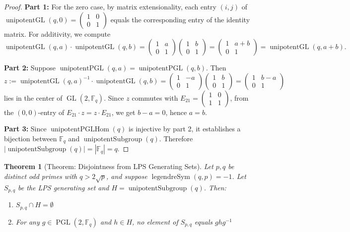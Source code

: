 \documentclass[11pt]{article}
\theoremstyle{plain}
\newtheorem*{theorem}{Theorem}
\theoremstyle{definition}
\theoremstyle{remark}
\begin{document}
\begin{proof}
\textbf{Part 1:} For the zero case, by matrix extensionality, each entry $(i,j)$ of $\operatorname{unipotentGL}(q,0) = \begin{pmatrix}1&0\\0&1\end{pmatrix}$ equals the corresponding entry of the identity matrix. For additivity, we compute
\[
\operatorname{unipotentGL}(q,a) \cdot \operatorname{unipotentGL}(q,b) = \begin{pmatrix}1&a\\0&1\end{pmatrix}\begin{pmatrix}1&b\\0&1\end{pmatrix} = \begin{pmatrix}1&a+b\\0&1\end{pmatrix} = \operatorname{unipotentGL}(q,a+b).
\]

\textbf{Part 2:} Suppose $\operatorname{unipotentPGL}(q,a) = \operatorname{unipotentPGL}(q,b)$. Then
\[
z := \operatorname{unipotentGL}(q,a)^{-1} \cdot \operatorname{unipotentGL}(q,b) = \begin{pmatrix}1&-a\\0&1\end{pmatrix}\begin{pmatrix}1&b\\0&1\end{pmatrix} = \begin{pmatrix}1&b-a\\0&1\end{pmatrix}
\]
lies in the center of $\operatorname{GL}(2, \mathbb{F}_q)$. Since $z$ commutes with $E_{21} = \begin{pmatrix}1&0\\1&1\end{pmatrix}$, from the $(0,0)$-entry of $E_{21} \cdot z = z \cdot E_{21}$, we get $b - a = 0$, hence $a = b$.

\textbf{Part 3:} Since $\operatorname{unipotentPGLHom}(q)$ is injective by part 2, it establishes a bijection between $\mathbb{F}_q$ and $\operatorname{unipotentSubgroup}(q)$. Therefore $|\operatorname{unipotentSubgroup}(q)| = |\mathbb{F}_q| = q$.
\end{proof}

\begin{theorem}[Theorem: Disjointness from LPS Generating Sets]
Let $p, q$ be distinct odd primes with $q > 2\sqrt{p}$, and suppose $\operatorname{legendreSym}(q, p) = -1$. Let $S_{p,q}$ be the LPS generating set and $H = \operatorname{unipotentSubgroup}(q)$. Then:
\begin{enumerate}
\item $S_{p,q} \cap H = \emptyset$
\item For any $g \in \operatorname{PGL}(2,\mathbb{F}_q)$ and $h \in H$, no element of $S_{p,q}$ equals $ghg^{-1}$
\end{enumerate}
\end{theorem}
\end{document}
